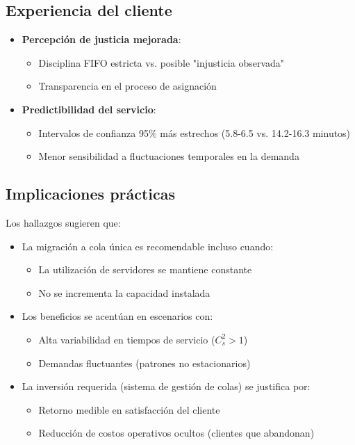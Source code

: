 \documentclass{article}
\begin{document}
\subsection{Experiencia del cliente}
\begin{itemize}
\item \textbf{Percepción de justicia mejorada}:
\begin{itemize}
\item Disciplina FIFO estricta vs. posible "injusticia observada"
\item Transparencia en el proceso de asignación
\end{itemize}

\item \textbf{Predictibilidad del servicio}:
\begin{itemize}
\item Intervalos de confianza 95\% más estrechos (5.8-6.5 vs. 14.2-16.3 minutos)
\item Menor sensibilidad a fluctuaciones temporales en la demanda
\end{itemize}
\end{itemize}

\subsection{Implicaciones prácticas}
Los hallazgos sugieren que:

\begin{itemize}
\item La migración a cola única es recomendable incluso cuando:
\begin{itemize}
\item La utilización de servidores se mantiene constante
\item No se incrementa la capacidad instalada
\end{itemize}

\item Los beneficios se acentúan en escenarios con:
\begin{itemize}
\item Alta variabilidad en tiempos de servicio ($C_s^2 > 1$)
\item Demandas fluctuantes (patrones no estacionarios)
\end{itemize}

\item La inversión requerida (sistema de gestión de colas) se justifica por:
\begin{itemize}
\item Retorno medible en satisfacción del cliente
\item Reducción de costos operativos ocultos (clientes que abandonan)
\end{itemize}
\end{itemize}
\end{document}
